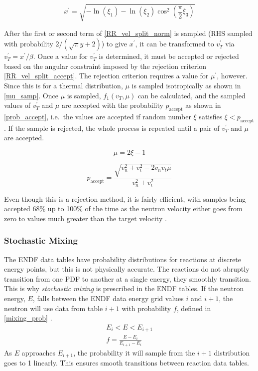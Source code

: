 \begin{equation}
\label{C61_x}
x^\prime =   \sqrt{- \ln( \xi_1) - \ln(\xi_2) \cos^2(\frac{\pi}{2}\xi_3)}
\end{equation}


After the first or second term of \eqref{RR_vel_split_norm} is sampled (RHS sampled with probability $2/(\sqrt{\pi}y+2)$) to give $x^\prime$, it can be transformed to $v_T^\prime$ via $v_T^\prime=x^\prime/\beta$.  Once a value for $v_T^\prime$ is determined, it must be accepted or rejected based on the angular constraint imposed by the rejection criterion \eqref{RR_vel_split_accept}.  The rejection criterion requires a value for $\mu^\prime$, however.  Since this is for a thermal distribution, $\mu$ is sampled isotropically as shown in \eqref{mu_samp}.  Once $\mu$ is sampled, $f_1(v_T,\mu)$ can be calculated, and the sampled values of $v_T^\prime$ and $\mu$ are accepted with the probability $p_\mathrm{accept}$ as shown in \eqref{prob_accept}, i.e.\ the values are accepted if random number $\xi$ satisfies $\xi<p_\mathrm{accept}$.  If the sample is rejected, the whole process is repeated until a pair of $v_T^\prime$ and $\mu$ are accepted.  


\begin{equation}
\label{mu_samp}
\mu = 2\xi - 1 
\end{equation}

\begin{equation}
\label{prob_accept}
p_\mathrm{accept} = \frac{\sqrt{v_n^2+v_t^2-2 v_n v_t \mu}}{v_n^2+v_t^2}
\end{equation}

Even though this is a rejection method, it is fairly efficient, with samples being accepted 68\% up to 100\% of the time as the neutron velocity either goes from zero to values much greater than the target velocity \cite{mcnp}.

\subsubsection{Stochastic Mixing}

The ENDF data tables have probability distributions for reactions at discrete energy points, but this is not physically accurate.  The reactions do not abruptly transition from one PDF to another at a single energy, they smoothly transition.  This is why \emph{stochastic mixing} is prescribed in the ENDF tables.  If the neutron energy, $E$, falls between the ENDF data energy grid values $i$ and $i+1$, the neutron will use data from table $i+1$ with probability $f$, defined in \eqref{mixing_prob} \cite{openmc}.
%
\begin{equation}
\label{mixing_prob}
\begin{gathered}
E_i < E < E_{i+1} \\
f = \frac{E-E_i}{E_{i+1}-E_i}
\end{gathered}
\end{equation}
%
As $E$ approaches $E_{i+1}$, the probability it will sample from the $i+1$ distribution goes to 1 linearly.  This ensures smooth transitions between reaction data tables.



